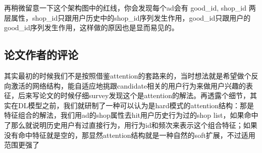 \documentclass[12pt]{article}
\begin{document}
再稍微留意一下这个架构图中的红线，你会发现每个ad会有 good\_id, shop\_id 两层属性，shop\_id只跟用户历史中的shop\_id序列发生作用，good\_id只跟用户的good\_id序列发生作用，这样做的原因也是显而易见的。

\subsection{论文作者的评论}
其实最初的时候我们不是按照借鉴attention的套路来的，当时想法就是希望做个反向激活的网络结构，能自适应地挑跟candidate相关的用户行为来做用户兴趣的表征，后来写论文的时候仔细survey发现这个是attention的解法。再透露个细节，其实在DL模型之前，我们就研制了一种可以认为是hard模式的attention结构：那是特征组合的解法，我们用ad的shop属性去hit用户历史行为过的shop list，如果命中了那么就说明历史用户有过直接行为，用行为id和频次来表示这个组合特征；如果没有命中特征就是空的，那显然attention结构就是一种自然的soft扩展，不过适用范围更强了



\end{document}
